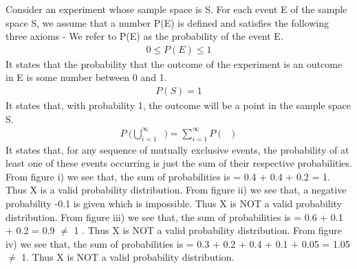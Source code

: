 \documentclass[journal,12pt,twocolumn]{IEEEtran}
\begin{document}
\subsection*{}\\
\begin{flushleft}
Consider an experiment whose sample space is S. For each event E of the sample
space S, we assume that a number P(E) is defined and satisfies the following three
axioms -
\newline
We refer to P(E) as the probability of the event E.
\newline
\newline
\newline
\newline
\newline
{}
\begin{align}
    0 \leq P (E) \leq 1
\end{align}
It states that the probability that the outcome of the experiment is an outcome in E is some number between 0 and 1.
\newline
\newline
{}
\begin{align}
    P (S) = 1
\end{align}
It states that, with probability 1, the outcome will be a point in the sample space S.
\newline
\newline
{}
\begin{align}
    P\ \Bigg(\bigcup_{i=1}^{\infty} \mathop{E_i} \Bigg) = \sum_{i=1}^{\infty} P (\mathop{E_i})
\end{align}
It states that, for any sequence of mutually exclusive events, the probability of at least one of these events occurring is just the sum of their respective probabilities.
\newline
\newline
From figure i) we see that, the sum of probabilities is = 0.4 + 0.4 + 0.2 = 1.
\newline Thus X is a valid probability distribution.
\newline
\newline
From figure ii) we see that, a negative probability -0.1 is given which is impossible.
\newline Thus X is NOT a valid probability distribution.
\newline
\newline
From figure iii) we see that, the sum of probabilities is = 0.6 + 0.1 + 0.2 = 0.9 $\neq$ 1 .
\newline Thus X is NOT a valid probability distribution.
\newline
\newline
From figure iv) we see that, the sum of probabilities is = 0.3 + 0.2 + 0.4 + 0.1 + 0.05 = 1.05 $\neq$ 1.
\newline Thus X is NOT a valid probability distribution.
\newline
\end{flushleft}
\end{document}
